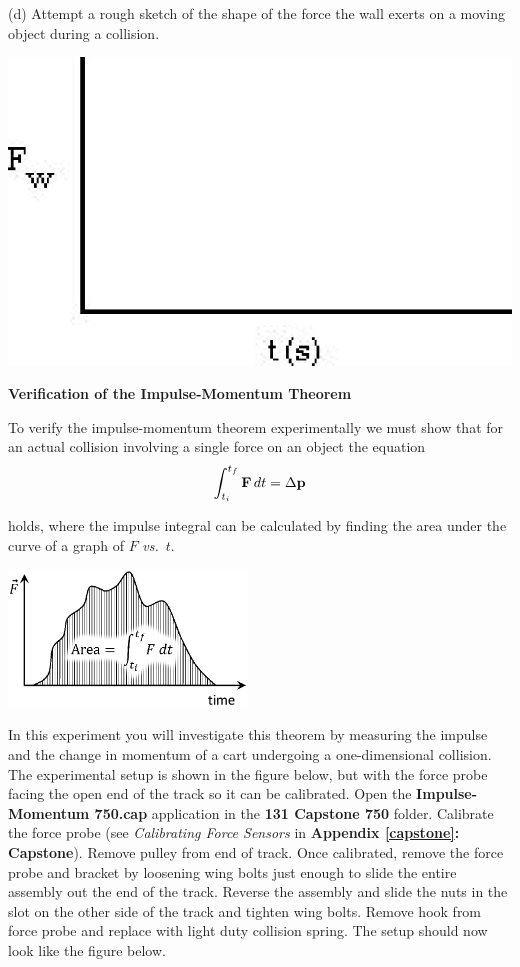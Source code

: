 (d) Attempt a rough sketch of the shape of the force the wall exerts on a moving
object during a collision.

\vspace{0.3cm}
{\par\centering \includegraphics{impulse/impulse_fig2.eps} \par}
\vspace{0.3cm}

\textbf{Verification of the Impulse-Momentum Theorem} 

To verify the impulse-momentum theorem experimentally we must show that for
an actual collision involving a single force on an object the equation
\[
\int_{t_{i}}^{t_{f}}{\bf F}\,dt=\Delta {\bf p}\]


holds, where the impulse integral can be calculated by finding the area under
the curve of a graph of $F$ \textit{vs.}~$t$.

{\par\centering \includegraphics[width=2.5in]{impulse/impulse_fig3_new.eps} \par}

In this experiment you will investigate this theorem by measuring the impulse
and the change in momentum of a cart undergoing a one-dimensional collision.
The experimental setup is shown in the figure below, but with the force probe 
facing the open end of the track so it can be calibrated.  Open the \textbf{Impulse-Momentum 750.cap} application in the \textbf{131 Capstone 750} folder. Calibrate the force probe 
(see \textit{Calibrating Force Sensors} in \textbf{Appendix \ref{capstone}: Capstone}). 
Remove pulley from end of track. Once calibrated, remove the force probe and 
bracket by loosening wing bolts just enough to slide the entire assembly out the 
end of the track. Reverse the assembly and slide the nuts in the slot on the 
other side of the track and tighten wing bolts. Remove hook from force probe and 
replace with light duty collision spring. The setup should now look like the figure 
below.

